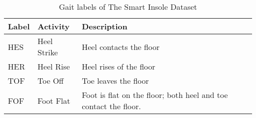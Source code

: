 \vspace{0.5cm} 

\begin{table} [h!]
    \centering
    \begin{tabular}{|>{\centering}m{2.5cm} |>{\centering}m{2.5cm} |>{\centering}m{6.5cm} |}
        \hline
         \textbf{Label}   &  \textbf{Activity}   &  \textbf{Description}  \tabularnewline
        \hline
        HES	& Heel Strike & Heel contacts the floor \tabularnewline  
        \hline
        HER	& Heel Rise	& Heel rises of the floor \tabularnewline     
        \hline
        TOF	& Toe Off& Toe leaves the floor \tabularnewline
        \hline
        FOF	& Foot Flat & Foot is flat on the floor; both heel and toe contact the floor.\tabularnewline 
        \hline
    \end{tabular} 
    \caption{Gait labels of The Smart Insole Dataset}
    \label{tab:SmartInsoleGait}
\end{table}